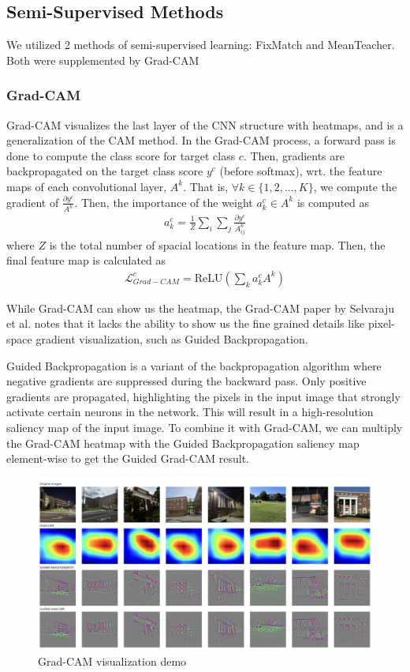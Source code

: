 \documentclass{article}
\begin{document}
\subsection{Semi-Supervised Methods}

We utilized 2 methods of semi-supervised learning: FixMatch and MeanTeacher. Both were supplemented by Grad-CAM

\subsubsection{Grad-CAM}

Grad-CAM visualizes the last layer of the CNN structure with heatmaps, and is a generalization of the CAM method. In the Grad-CAM process, a forward pass is done to compute the class score for target class $c$. Then, gradients are backpropagated on the target class score $y^c$ (before softmax), wrt. the feature maps of each convolutional layer, $A^k$. That is, $\forall k \in \{1, 2, ..., K\}$, we compute the gradient of $\frac{\partial y^c}{A^k}$. Then, the importance of the weight $a_k^c\in A^k$ is computed as \begin{align*}
    a_k^c=\frac{1}{Z}\sum_i\sum_j\frac{\partial y^c}{A_{ij}^k}
\end{align*} where $Z$ is the total number of spacial locations in the feature map. Then, the final feature map is calculated as \begin{align*}
    \mathcal{L}_{Grad-CAM}^c=\text{ReLU}\left(\sum_k a_k^cA^k\right)
\end{align*}

While Grad-CAM can show us the heatmap, the Grad-CAM paper by Selvaraju et al. \cite{selvaraju} notes that it lacks the ability to show us the fine grained details like pixel-space gradient visualization, such as Guided Backpropagation. 

Guided Backpropagation is a variant of the backpropagation algorithm where negative gradients are suppressed during the backward pass. Only positive gradients are propagated, highlighting the pixels in the input image that strongly activate certain neurons in the network. This will result in a high-resolution saliency map of the input image. To combine it with Grad-CAM, we can multiply the Grad-CAM heatmap with the Guided Backpropagation saliency map element-wise to get the Guided Grad-CAM result.  

\begin{figure}[H]
    \centering
    \includegraphics[width=0.8\linewidth]{gradcam_demo.png}
    \caption{Grad-CAM visualization demo}
    \label{fig:gradcam_demo}
\end{figure}
\end{document}

